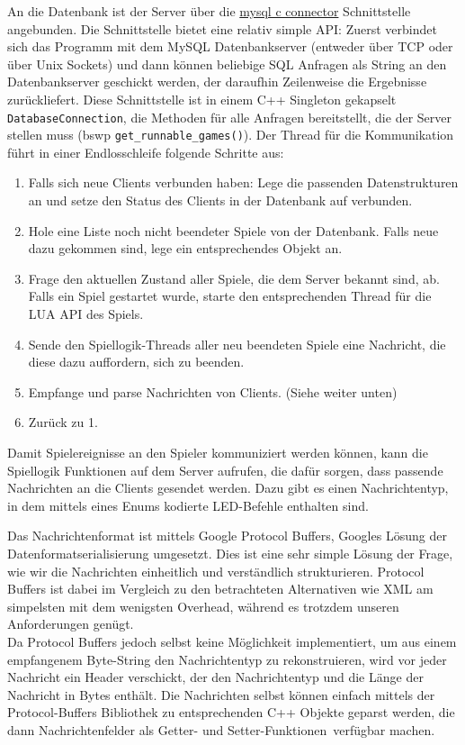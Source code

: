 An die Datenbank ist der Server über die \href{https://dev.mysql.com/doc/connector-c/en/connector-c-introduction.html}{mysql c connector} Schnittstelle angebunden. Die Schnittstelle bietet eine relativ simple API: Zuerst verbindet sich das Programm mit dem MySQL Datenbankserver (entweder über TCP oder über Unix Sockets) und dann können beliebige SQL Anfragen als String an den Datenbankserver geschickt werden, der daraufhin Zeilenweise die Ergebnisse zurückliefert.
Diese Schnittstelle ist in einem C++ Singleton gekapselt \texttt{DatabaseConnection}, die Methoden für alle Anfragen
bereitstellt, die der Server stellen muss (bswp \texttt{get\_runnable\_games()}). 
\newpline
\newline
Der Thread für die Kommunikation führt in einer Endlosschleife folgende Schritte aus:
\begin{enumerate}
    \item Falls sich neue Clients verbunden haben: Lege die passenden Datenstrukturen an und setze den Status des Clients in der Datenbank auf verbunden.
    \item Hole eine Liste noch nicht beendeter Spiele von der Datenbank. Falls neue dazu gekommen sind, lege ein entsprechendes Objekt an.
    \item Frage den aktuellen Zustand aller Spiele, die dem Server bekannt sind, ab. Falls ein Spiel gestartet wurde, starte den entsprechenden Thread für die LUA API des Spiels.
    \item Sende den Spiellogik-Threads aller neu beendeten Spiele eine Nachricht, die diese dazu auffordern, sich zu beenden.
    \item Empfange und parse Nachrichten von Clients. (Siehe weiter unten)
    \item Zurück zu 1.
\end{enumerate}

Damit Spielereignisse an den Spieler kommuniziert werden können, kann die Spiellogik Funktionen auf dem Server aufrufen, die dafür sorgen, dass passende Nachrichten an die Clients gesendet werden. Dazu gibt es einen Nachrichtentyp, in dem mittels eines Enums kodierte LED-Befehle enthalten sind. 

Das Nachrichtenformat ist mittels Google Protocol Buffers, Googles Lösung der Datenformatserialisierung umgesetzt. Dies ist eine sehr simple Lösung der Frage, wie wir die Nachrichten einheitlich und verständlich strukturieren. Protocol Buffers ist dabei im Vergleich zu den betrachteten Alternativen wie XML am simpelsten mit dem wenigsten Overhead, während es trotzdem unseren Anforderungen genügt.\\
 Da Protocol Buffers jedoch selbst keine Möglichkeit
implementiert, um aus einem empfangenem Byte-String den Nachrichtentyp zu rekonstruieren, wird vor jeder Nachricht
ein Header verschickt, der den Nachrichtentyp und die Länge der Nachricht in Bytes enthält.
Die Nachrichten selbst können einfach mittels der Protocol-Buffers Bibliothek zu entsprechenden C++ Objekte geparst werden, die dann Nachrichtenfelder als \glqq Getter- und Setter-Funktionen\grqq \, verfügbar machen.

